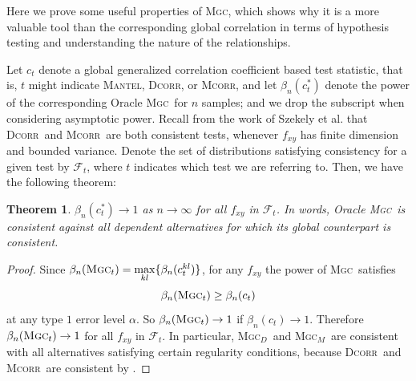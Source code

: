 \documentclass[11pt]{article}
\providecommand{\sct}[1]{{\normalfont\textsc{#1}}}
\providecommand{\mc}[1]{\mathcal{#1}}
\newcommand{\G}{c}
\newcommand{\Mgc}{\sct{Mgc}}
\newcommand{\Mgcd}{\sct{Mgc$_D$}}
\newcommand{\Mgcm}{\sct{Mgc$_M$}}
\newcommand{\Dcorr}{\sct{Dcorr}}
\newcommand{\Mcorr}{\sct{Mcorr}}
\newcommand{\Mantel}{\sct{Mantel}}
\newtheorem{thm}{Theorem}
\begin{document}
Here we prove some useful properties of \Mgc, which shows why it is a more valuable tool than the corresponding global correlation in terms of hypothesis testing and understanding the nature of the relationships.

Let $\G_t$ denote a global generalized correlation coefficient based test statistic, that is, $t$ might indicate \Mantel, \Dcorr, or \Mcorr, and let $\beta_n(\G_t^*)$ denote the power of the corresponding Oracle \Mgc~for $n$ samples; and we drop the subscript when considering asymptotic power.
Recall from the work of Szekely et al. that \Dcorr~and \Mcorr~are both consistent tests, whenever $f_{xy}$ has finite dimension and bounded variance.  Denote the set of distributions satisfying consistency for a given test by $\mc{F}_t$, where $t$ indicates which test we are referring to. Then, we have the following theorem:
\begin{thm}
\label{thm1}
$\beta_n(\G_t^*) \rightarrow 1$ as $n \to \infty$ for all $f_{xy}$ in $\mc{F}_t$.
In words, Oracle \Mgc~is consistent against all dependent alternatives for which its global counterpart is consistent. 
\end{thm}
\begin{proof}
Since $\beta_n(\Mgc_t)=\underset{kl}{\max}\{\beta_n(\G_t^{kl})\}$, for any $f_{xy}$ the power of \Mgc~satisfies
\begin{equation*}
\beta_n(\Mgc_t) \geq \beta_n(\G_t)
\end{equation*}
at any type $1$ error level $\alpha$. So $\beta_n(\Mgc_t) \rightarrow 1$ if $\beta_n(\G_t) \rightarrow 1$.
% 
Therefore $\beta_n(\Mgc_t) \rightarrow 1$ for all $f_{xy}$ in $\mc{F}_t$. In particular, \Mgcd~and \Mgcm~are consistent with all alternatives satisfying certain regularity conditions, because \Dcorr~and \Mcorr~are consistent by \cite{SzekelyRizzoBakirov2007, SzekelyRizzo2013a}. 
\end{proof}
\end{document}
